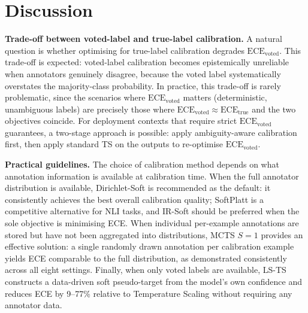 \documentclass[10pt,journal,compsoc]{IEEEtran}
\newcommand{\ECE}{\mathrm{ECE}}
\newcommand{\ECEvoted}{\ECE_{\text{voted}}}
\newcommand{\ECEtrue}{\ECE_{\text{true}}}
\begin{document}
\section{Discussion}
\label{sec:discussion}

\noindent\textbf{Trade-off between voted-label and true-label calibration.}
A natural question is whether optimising for true-label calibration degrades $\ECEvoted$.  This trade-off is expected: voted-label calibration becomes epistemically unreliable when annotators genuinely disagree, because the voted label systematically overstates the majority-class probability.  In practice, this trade-off is rarely problematic, since the scenarios where $\ECEvoted$ matters (deterministic, unambiguous labels) are precisely those where $\ECEvoted\approx\ECEtrue$ and the two objectives coincide.  For deployment contexts that require strict $\ECEvoted$ guarantees, a two-stage approach is possible: apply ambiguity-aware calibration first, then apply standard TS on the outputs to re-optimise $\ECEvoted$.

\noindent\textbf{Practical guidelines.}
The choice of calibration method depends on what annotation information is available at calibration time.  When the full annotator distribution is available, Dirichlet-Soft is recommended as the default: it consistently achieves the best overall calibration quality; SoftPlatt is a competitive alternative for NLI tasks, and IR-Soft should be preferred when the sole objective is minimising ECE.  When individual per-example annotations are stored but have not been aggregated into distributions, MCTS $S{=}1$ provides an effective solution: a single randomly drawn annotation per calibration example yields ECE comparable to the full distribution, as demonstrated consistently across all eight settings.  Finally, when only voted labels are available, LS-TS constructs a data-driven soft pseudo-target from the model's own confidence and reduces ECE by 9--77\% relative to Temperature Scaling without requiring any annotator data.
\end{document}
